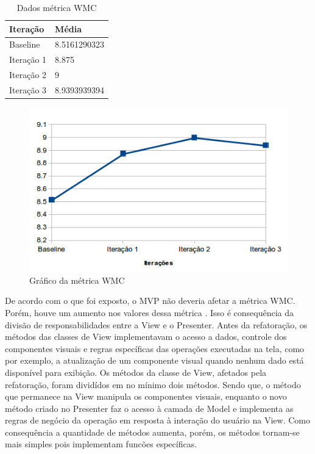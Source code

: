 \begin{table}[!h]
	\centering
	\caption{Dados métrica WMC}
    \begin{tabular}{ | l | l | }
    \hline
    Iteração & Média 			\\ \hline
    Baseline & 8.5161290323   	\\ \hline
    Iteração 1 & 8.875			\\ \hline
	Iteração 2 & 9				\\ \hline
	Iteração 3 & 8.9393939394	\\ \hline
    \end{tabular}
    
    \label{tab:wmc}
\end{table}


\begin{figure}[!htb]
	\label{fig:wmc}
	\caption{Gráfico da métrica WMC}   
	\begin{center}
		\includegraphics{img/wmc.png}
	\end{center}
\end{figure}



De acordo com o que foi exposto, o MVP não deveria afetar a métrica WMC. Porém,
houve um aumento nos valores dessa métrica . Isso é consequência da divisão de
responsabilidades entre a View e o Presenter. Antes da refatoração, os métodos
das classes de View implementavam o acesso a dados, controle dos componentes
visuais e regras específicas das operações executadas na tela, como por exemplo,
a atualização de um componente visual quando nenhum dado está disponível para
exibição. Os métodos da classe de View, afetados pela refatoração, foram
dividídos em no mínimo dois métodos. Sendo que, o método que permanece na View
manipula os componentes visuais, enquanto o novo método criado no Presenter faz
o acesso à camada de Model e implementa as regras de negócio da operação em
resposta à interação do usuário na View. Como consequência a quantidade de
métodos aumenta, porém, os métodos tornam-se mais simples pois implementam
funcões específicas. 

